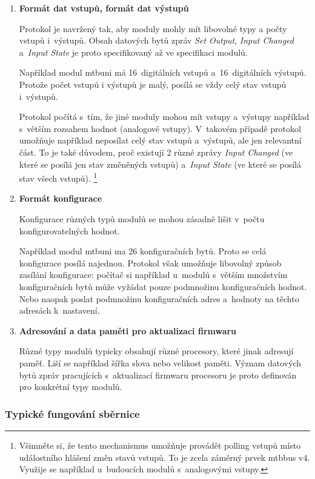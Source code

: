 \begin{enumerate}
\item \textbf{Formát dat vstupů, formát dat výstupů}

Protokol je navržený tak, aby moduly mohly mít libovolné typy a počty vstupů
i~výstupů. Obsah datových bytů zpráv \textit{Set Output}, \textit{Input
Changed} a~\textit{Input State} je proto specifikovaný až ve specifikaci modulů.

Například modul \gls{mtbuni} má 16~digitálních vstupů a~16~digitálních výstupů.
Protože počet vstupů i výstupů je malý, posílá se vždy celý stav
vstupů i~výstupů.

Protokol počítá s~tím, že jiné moduly mohou mít vstupy a~výstupy například
s~větším rozsahem hodnot (analogové vstupy). V~takovém případě protokol
umožňuje například neposílat celý stav vstupů a~výstupů, ale jen relevantní
část. To je také důvodem, proč existují 2 různé zprávy
\textit{Input Changed} (ve které se posílá jen stav změněných vstupů)
a~\textit{Input State} (ve které se posílá stav všech vstupů).
\footnote{Všimněte si, že tento mechanismus umožňuje provádět polling
vstupů místo událostního hlášení změn stavů vstupů. To je zcela záměrný prvek
\gls{mtbbus} v4. Využije se například u~budoucích modulů s~analogovými vstupy.}

\item \textbf{Formát konfigurace}

Konfigurace různých typů modulů se mohou zásadně lišit v~počtu
konfigurovatelných hodnot.

Například modul \gls{mtbuni} ma 26 konfiguračních bytů. Proto se celá
konfigurace posílá najednou. Protokol však umožňuje libovolný způsob
zasílání konfigurace: počítač si například u~modulů s~větším množstvím konfiguračních
bytů může vyžádat pouze podmnožinu konfiguračních hodnot. Nebo naopak poslat
podmnožinu konfiguračních adres a~hodnoty na těchto adresách k~nastavení.

\item \textbf{Adresování a data paměti pro aktualizaci firmwaru}

Různé typy modulů typicky obsahují různé procesory, které jinak adresují paměť.
Liší se například šířka slova nebo velikost paměti. Význam datových bytů
zpráv pracujících s~aktualizací firmwaru procesoru je proto definován pro
konkrétní typy modulů.

\end{enumerate}

\subsubsection{Typické fungování sběrnice}

